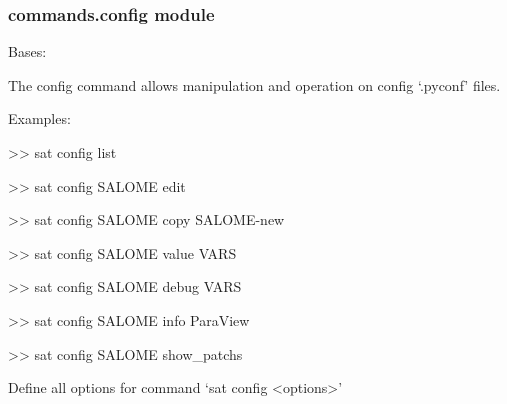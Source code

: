 \documentclass[a4paper,10pt,english]{sphinxmanual}
\begin{document}
\subsubsection{commands.config module}
\label{\detokenize{apidoc_commands/commands:commands-config-module}}\label{\detokenize{apidoc_commands/commands:module-commands.config}}

\begin{fulllineitems}
\label{\detokenize{apidoc_commands/commands:commands.config.Command}}
Bases: 

The config command allows manipulation and operation on config ‘.pyconf’ files.

\begin{DUlineblock}{0em}
\item[] Examples:
\item[] \textgreater{}\textgreater{} sat config \textendash{}list
\item[] \textgreater{}\textgreater{} sat config SALOME \textendash{}edit
\item[] \textgreater{}\textgreater{} sat config SALOME \textendash{}copy SALOME-new
\item[] \textgreater{}\textgreater{} sat config SALOME \textendash{}value VARS
\item[] \textgreater{}\textgreater{} sat config SALOME \textendash{}debug VARS
\item[] \textgreater{}\textgreater{} sat config SALOME \textendash{}info ParaView
\item[] \textgreater{}\textgreater{} sat config SALOME \textendash{}show\_patchs
\end{DUlineblock}

\begin{fulllineitems}
\label{\detokenize{apidoc_commands/commands:commands.config.Command.getParser}}
Define all options for command ‘sat config \textless{}options\textgreater{}’

\end{fulllineitems}



\end{fulllineitems}
\end{document}
